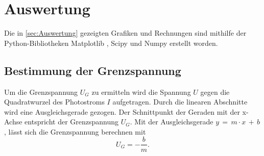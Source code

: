 \section{Auswertung}
\label{sec:Auswertung}

Die in \autoref{sec:Auswertung} gezeigten Grafiken und Rechnungen sind mithilfe der Python-Bibliotheken Matplotlib \cite{matplotlib}, Scipy \cite{scipy} und Numpy \cite{numpy}
erstellt worden.

\subsection{Bestimmung der Grenzspannung}
\label{sec:auswertung_grenzspannung}

Um die Grenzspannung $U_G$ zu ermitteln wird die Spannung $U$ gegen die Quadratwurzel des Photostroms $I$ aufgetragen. 
Durch die linearen Abschnitte wird eine Ausgleichsgerade gezogen.
Der Schnittpunkt der Geraden mit der x-Achse entspricht der Grenzspannung $U_G$.
Mit der Ausgleichsgerade $y \,=\, m \cdot x \,+\, b$, lässt sich die Grenzspannung berechnen mit
\begin{equation}\label{eq:ug}
  U_G = - \frac{b}{m}.
\end{equation}
\\
\\
